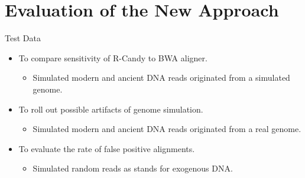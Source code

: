 \documentclass{beamer}
\begin{document}


\section{Evaluation of the New Approach}
\begin{frame}{Test Data }
	\begin{itemize}
		\item To compare sensitivity of R-Candy to BWA aligner.
			\begin{itemize}
				\item Simulated modern and ancient DNA reads originated from a simulated genome.
			\end{itemize}	
		\item To roll out possible artifacts of genome simulation.
			\begin{itemize}
				\item Simulated modern and ancient DNA reads originated from a real genome.
			\end{itemize}
		\item To evaluate the rate of false positive alignments.
			\begin{itemize}
				\item Simulated random reads as stands for exogenous DNA.
			\end{itemize}
	\end{itemize}
\end{frame}


\end{document}
